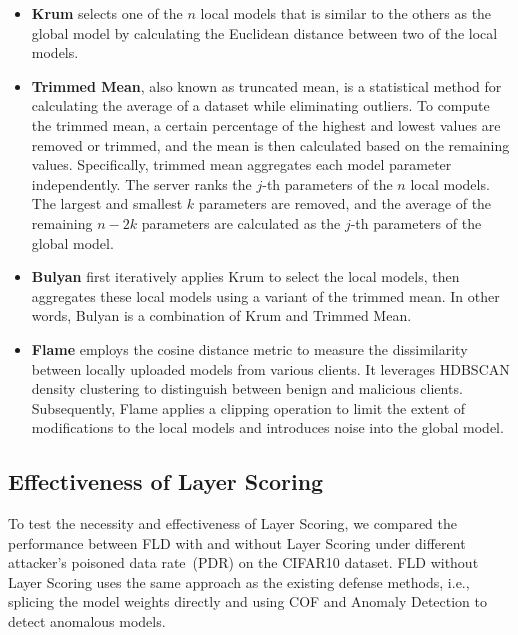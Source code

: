 \begin{itemize}
    \item \textbf{Krum} selects one of the $n$ local models that is similar to the others as the global model by calculating the Euclidean distance between two of the local models.
    \item \textbf{Trimmed Mean}, also known as truncated mean, is a statistical method for calculating the average of a dataset while eliminating outliers. To compute the trimmed mean, a certain percentage of the highest and lowest values are removed or trimmed, and the mean is then calculated based on the remaining values. Specifically, trimmed mean aggregates each model parameter independently. The server ranks the $j$-th parameters of the $n$ local models. The largest and smallest $k$ parameters are removed, and the average of the remaining $n-2k$ parameters are calculated as the $j$-th parameters of the global model.
    \item \textbf{Bulyan} first iteratively applies Krum to select the local models, then aggregates these local models using a variant of the trimmed mean. In other words, Bulyan is a combination of Krum and Trimmed Mean.
    \item \textbf{Flame} 
    employs the cosine distance metric to measure the dissimilarity between locally uploaded models from various clients. It leverages HDBSCAN density clustering to distinguish between benign and malicious clients. Subsequently, Flame applies a clipping operation to limit the extent of modifications to the local models and introduces noise into the global model.
    
\end{itemize}


\subsection{Effectiveness of Layer Scoring}
To test the necessity and effectiveness of Layer Scoring, we compared the performance between FLD with and without Layer Scoring under different attacker's poisoned data rate~(PDR) on the CIFAR10 dataset. FLD without Layer Scoring uses the same approach as the existing defense methods, i.e., splicing the model weights directly and using COF and Anomaly Detection to detect anomalous models.

